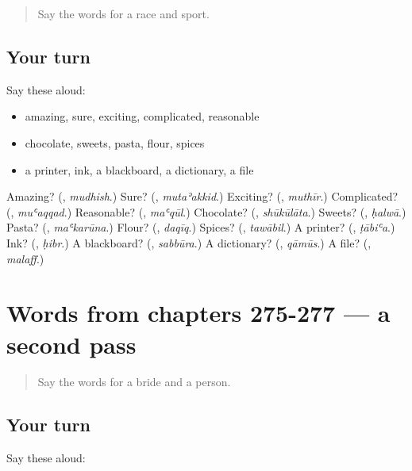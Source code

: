 \begin{quote}
Say the words for a race and sport.
\end{quote}

\subsection*{Your turn}
Say these aloud:

\begin{itemize}
\raggedright
  \item amazing, sure, exciting, complicated, reasonable
  \item chocolate, sweets, pasta, flour, spices
  \item a printer, ink, a blackboard, a dictionary, a file
\end{itemize}

\begin{tcolorbox}[breakable,colback=teal!4,colframe=teal!35!black,title={Before you move on}]
Amazing? (\textbf{}, \emph{mudhish}.) Sure? (\textbf{}, \emph{mutaʾakkid}.) Exciting? (\textbf{}, \emph{muthīr}.) Complicated? (\textbf{}, \emph{muʿaqqad}.) Reasonable? (\textbf{}, \emph{maʿqūl}.) Chocolate? (\textbf{}, \emph{shūkūlāta}.) Sweets? (\textbf{}, \emph{ḥalwā}.) Pasta? (\textbf{}, \emph{maʿkarūna}.) Flour? (\textbf{}, \emph{daqīq}.) Spices? (\textbf{}, \emph{tawābil}.) A printer? (\textbf{}, \emph{ṭābiʿa}.) Ink? (\textbf{}, \emph{ḥibr}.) A blackboard? (\textbf{}, \emph{sabbūra}.) A dictionary? (\textbf{}, \emph{qāmūs}.) A file? (\textbf{}, \emph{malaff}.)
\end{tcolorbox}
\section[(dialogue)]{Words from chapters 275-277 — a second pass}

\label{lesson:AR-R277-second-pass-words-from-chapters-275-277}



\begin{quote}
Say the words for a bride and a person.
\end{quote}

\subsection*{Your turn}
Say these aloud:


